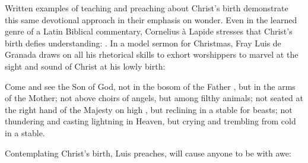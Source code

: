 Written examples of teaching and preaching about Christ's birth demonstrate this
same devotional approach in their emphasis on wonder.
Even in the learned genre of a Latin Biblical commentary, Cornelius à Lapide
stresses that Christ's birth defies understanding: 
.%
    \Autocite
    [50, on : .]
    {Lapide:Gospels19C}
In a model sermon for Christmas, Fray Luis de Granada draws on all his
rhetorical skills to exhort worshippers to marvel at the sight and sound of
Christ at his lowly birth:
\begin{quoting}
    Come and see the Son of God, not in the bosom of the Father , but
    in the arms of the Mother; not above choirs of angels, but among filthy
    animals; not seated at the right hand of the Majesty on high ,
    but reclining in a stable for beasts; not thundering and casting lightning
    in Heaven, but crying and trembling from cold in a stable.%
        \Autocite
        [37: .]
        {LuisdeGranada:Xmas}
\end{quoting}
Contemplating Christ's birth, Luis preaches, will cause anyone to be
 with awe:
